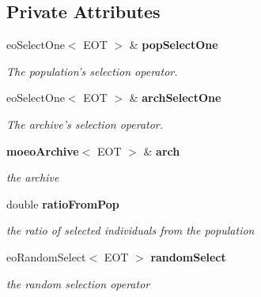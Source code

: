 \subsection*{Private Attributes}
\begin{CompactItemize}
\item 
eo\-Select\-One$<$ EOT $>$ \& {\bf pop\-Select\-One}\label{classmoeoSelectOneFromPopAndArch_4f6d51d06d92b0a3383f9f47e3b2b682}

\begin{CompactList}\small\item\em The population's selection operator. \item\end{CompactList}\item 
eo\-Select\-One$<$ EOT $>$ \& {\bf arch\-Select\-One}\label{classmoeoSelectOneFromPopAndArch_5e062a1deca0307a91121271d3b976ba}

\begin{CompactList}\small\item\em The archive's selection operator. \item\end{CompactList}\item 
{\bf moeo\-Archive}$<$ EOT $>$ \& {\bf arch}\label{classmoeoSelectOneFromPopAndArch_3ca71296847a931355a1e88d0cc524cb}

\begin{CompactList}\small\item\em the archive \item\end{CompactList}\item 
double {\bf ratio\-From\-Pop}\label{classmoeoSelectOneFromPopAndArch_97b57e598752bccafaaf6a8a724d9a43}

\begin{CompactList}\small\item\em the ratio of selected individuals from the population \item\end{CompactList}\item 
eo\-Random\-Select$<$ EOT $>$ {\bf random\-Select}\label{classmoeoSelectOneFromPopAndArch_77cbe0150e70219e5a7fd48296acc4c7}

\begin{CompactList}\small\item\em the random selection operator \item\end{CompactList}\end{CompactItemize}


